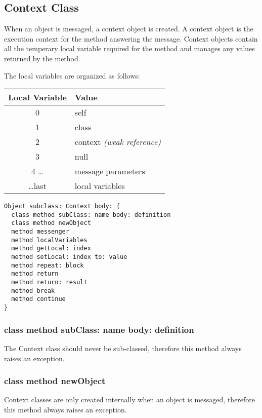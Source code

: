 \subsection {Context Class}

When an object is messaged, a context object is created. A context object is the execution context for the method answering the message. Context objects contain all the temperary local variable required for the method and manages any values returned by the method.

The local variables are organized as follows:

\begin{center}
  \begin{tabular}{ c | l }
  	Local Variable & Value                             \\ \hline
  	0              & self                              \\
  	1              & class                             \\
  	2              & context \textit{(weak reference)} \\
  	3              & null                              \\
  	4 \dots        & message parameters                \\
  	\dots last     & local variables
  \end{tabular}
\end{center}

\begin{lstlisting}
Object subclass: Context body: {
  class method subClass: name body: definition
  class method newObject
  method messenger
  method localVariables
  method getLocal: index
  method setLocal: index to: value
  method repeat: block
  method return
  method return: result
  method break
  method continue
}
\end{lstlisting}

\subsubsection {class method subClass: name body: definition}
The Context class should never be sub-classed, therefore this method always raises an exception.

\subsubsection {class method newObject}
Context classes are only created internally when an object is messaged, therefore this method always raises an exception.

